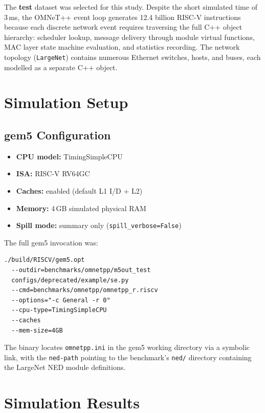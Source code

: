 \documentclass[conference]{IEEEtran}
\begin{document}
The \textbf{test} dataset was selected for this study. Despite the
short simulated time of 3\,ms, the OMNeT++ event loop generates
12.4 billion RISC-V instructions because each discrete network event
requires traversing the full C++ object hierarchy: scheduler lookup,
message delivery through module virtual functions, MAC layer state
machine evaluation, and statistics recording. The network topology
(\texttt{LargeNet}) contains numerous Ethernet switches, hosts, and
buses, each modelled as a separate C++ object.

\section{Simulation Setup}

\subsection{gem5 Configuration}

\begin{itemize}
    \item \textbf{CPU model:}   TimingSimpleCPU
    \item \textbf{ISA:}         RISC-V RV64GC
    \item \textbf{Caches:}      enabled (default L1 I/D + L2)
    \item \textbf{Memory:}      4\,GB simulated physical RAM
    \item \textbf{Spill mode:}  summary only (\texttt{spill\_verbose=False})
\end{itemize}

The full gem5 invocation was:

\begin{verbatim}
./build/RISCV/gem5.opt
  --outdir=benchmarks/omnetpp/m5out_test
  configs/deprecated/example/se.py
  --cmd=benchmarks/omnetpp/omnetpp_r.riscv
  --options="-c General -r 0"
  --cpu-type=TimingSimpleCPU
  --caches
  --mem-size=4GB
\end{verbatim}

The binary locates \texttt{omnetpp.ini} in the gem5 working directory
via a symbolic link, with the \texttt{ned-path} pointing to the
benchmark's \texttt{ned/} directory containing the LargeNet NED
module definitions.

\section{Simulation Results}
\end{document}
